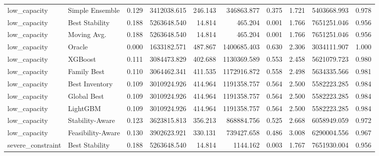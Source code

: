 \begin{table}
{\begin{tabular}{llrrrrrrrr}
      low\_capacity &    Simple Ensemble & 0.129 &     3412038.615 &           246.143 &         346863.877 &           0.375 &                  1.721 &     5403668.993 &          0.978 \\
      low\_capacity &     Best Stability & 0.188 &     5263648.540 &            14.814 &            465.204 &           0.001 &                  1.766 &     7651251.046 &          0.956 \\
      low\_capacity &        Moving Avg. & 0.188 &     5263648.540 &            14.814 &            465.204 &           0.001 &                  1.766 &     7651251.046 &          0.956 \\
      low\_capacity &             Oracle & 0.000 &     1633182.571 &           487.867 &        1400685.403 &           0.630 &                  2.306 &     3034111.907 &          1.000 \\
      low\_capacity &            XGBoost & 0.111 &     3084473.829 &           402.688 &        1130369.589 &           0.553 &                  2.458 &     5621079.723 &          0.980 \\
      low\_capacity &        Family Best & 0.110 &     3064462.341 &           411.535 &        1172916.872 &           0.558 &                  2.498 &     5634335.566 &          0.981 \\
      low\_capacity &     Best Inventory & 0.109 &     3010924.926 &           414.964 &        1191358.757 &           0.564 &                  2.500 &     5582223.285 &          0.984 \\
      low\_capacity &        Global Best & 0.109 &     3010924.926 &           414.964 &        1191358.757 &           0.564 &                  2.500 &     5582223.285 &          0.984 \\
      low\_capacity &           LightGBM & 0.109 &     3010924.926 &           414.964 &        1191358.757 &           0.564 &                  2.500 &     5582223.285 &          0.984 \\
      low\_capacity &    Stability-Aware & 0.123 &     3623815.813 &           356.213 &         868884.756 &           0.525 &                  2.668 &     6058949.059 &          0.972 \\
      low\_capacity &  Feasibility-Aware & 0.130 &     3902623.921 &           330.131 &         739427.658 &           0.486 &                  3.008 &     6290004.556 &          0.967 \\
 severe\_constraint &     Best Stability & 0.188 &     5263648.540 &            14.814 &           1144.162 &           0.003 &                  1.767 &     7651930.004 &          0.956 \\

\end{tabular}}
\end{table}
